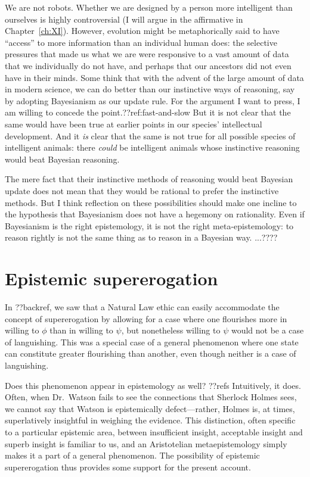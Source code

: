 We are not robots. Whether we are designed by a person more intelligent than ourselves is highly controversial (I will 
argue in the affirmative in Chapter~\ref{ch:XI}). However, evolution might be metaphorically said to have ``access'' to more 
information than an individual human does: the selective pressures that made us what we are were responsive to a vast amount
of data that we individually do not have, and perhaps that our ancestors did not even have in their minds. Some think 
that with the advent of the large amount of data in modern science, we can do 
better than our instinctive ways of reasoning, say by adopting Bayesianism as our update rule. For the argument I want 
to press, I am willing to concede the point.??ref:fast-and-slow But it is not clear that the same would have been true at earlier points 
in our species' intellectual development. And it \textit{is} clear that the same is not true for all possible species 
of intelligent animals: there \textit{could} be intelligent animals whose instinctive reasoning would beat Bayesian
reasoning. 

The mere fact that their instinctive methods of reasoning would beat Bayesian update does not mean that they would be 
rational to prefer the instinctive methods. But I think reflection on these possibilities should make one incline to 
the hypothesis that Bayesianism does not have a hegemony on rationality. Even if Bayesianism is the right epistemology,
it is not the right meta-epistemology: to reason rightly is not the same thing as to reason in a Bayesian way. ...????

\section{Epistemic supererogation}
In ??backref, we saw that a Natural Law ethic can easily accommodate the concept of supererogation by allowing for a case
where one flourishes more in willing to $\phi$ than in willing to $\psi$, but nonetheless willing to $\psi$ would not be a case of languishing. This was
a special case of a general phenomenon where one state can constitute greater flourishing than another, even though neither
is a case of languishing. 

Does this phenomenon appear in epistemology as well? ??refs  Intuitively, it does. Often, when Dr.~Watson fails to see the 
connections that Sherlock Holmes sees, we cannot say that Watson is epistemically defect---rather, Holmes is, at times, 
superlatively insightful in weighing the evidence. This distinction, often specific to a particular epistemic area, between
insufficient insight, acceptable insight and superb insight is familiar to us, and an Aristotelian metaepistemology simply
makes it a part of a general phenomenon. The possibility of epistemic supererogation thus provides some support for the 
present account.

